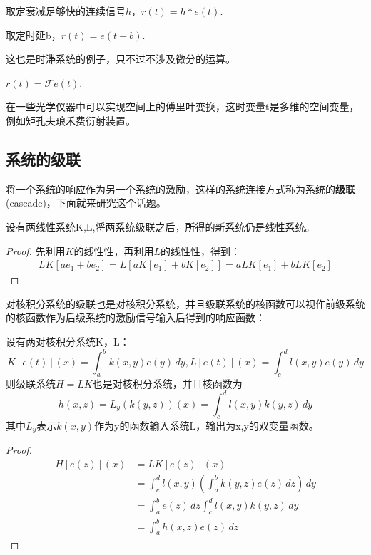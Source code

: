 \begin{example}[卷积]
    取定衰减足够快的连续信号$h$，$r(t)=h*e(t)$.
\end{example}

\begin{example}[信号平移]
    取定时延b，$r(t)=e(t-b)$.
\end{example}
这也是时滞系统的例子，只不过不涉及微分的运算。

\begin{example}[傅里叶变换]
$r(t)=\mathcal{F} e(t)$.

在一些光学仪器中可以实现空间上的傅里叶变换，这时变量t是多维的空间变量，例如矩孔夫琅禾费衍射装置。
\end{example}

\subsection{系统的级联}\label{sub:cascade}
将一个系统的响应作为另一个系统的激励，这样的系统连接方式称为系统的\textbf{级联}(cascade)，下面就来研究这个话题。
\begin{theorem}[线性系统的级联]
    设有两线性系统K,L,将两系统级联之后，所得的新系统仍是线性系统。
\end{theorem}
\begin{proof}
    先利用$K$的线性性，再利用$L$的线性性，得到：
    \begin{align*}
    LK[ae_1+be_2]=L[aK[e_1]+bK[e_2]]=aLK[e_1]+bLK[e_2]
\end{align*}
\end{proof}

对核积分系统的级联也是对核积分系统，并且级联系统的核函数可以视作前级系统的核函数作为后级系统的激励信号输入后得到的响应函数：
\begin{proposition}[对核积分系统的级联]
    设有两对核积分系统K，L：
    \[K[e(t)](x)=\int_{a}^{b}k(x,y)e(y)\,dy,L[e(t)](x)=\int_{c}^{d}l(x,y)e(y)\,dy\]
则级联系统$H=LK$也是对核积分系统，并且核函数为\begin{equation*}
    h(x,z)=L_y(k(y,z))(x)=\int_{c}^{d}l(x,y)k(y,z)\,dy
\end{equation*}
其中$L_y$表示$k(x,y)$作为y的函数输入系统L，输出为x,y的双变量函数。
\end{proposition}

\begin{proof}\begin{align*}
    H[e(z)](x)&=LK[e(z)](x)\\
    &=\int_{c}^{d}l(x,y)\left(\int_{a}^{b}k(y,z)e(z)\,dz\right)\,dy\\
    &=\int_{a}^{b}e(z)\,dz\int_{c}^{d}l(x,y)k(y,z)\,dy\\
    &=\int_{a}^{b}h(x,z)e(z)\,dz
\end{align*}
\end{proof}

